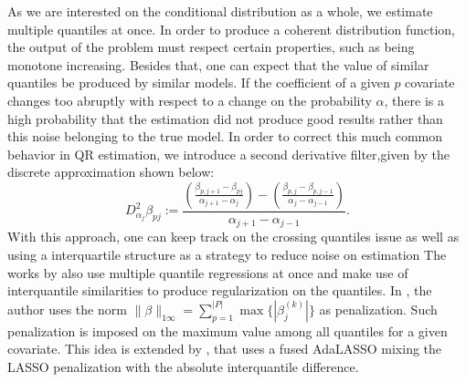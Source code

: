 As we are interested on the conditional distribution as a whole, we estimate multiple quantiles at once. In order to produce a coherent distribution function, the output of the problem must respect certain properties, such as being monotone increasing. 
Besides that, one can expect that the value of similar quantiles be produced by similar models. If the coefficient of a given $p$ covariate changes too abruptly with respect to a change on the probability $\alpha$, there is a high probability that the estimation did not produce good results rather than this noise belonging to the true model.  In order to correct this much common behavior in QR estimation, we introduce a second derivative filter,given by the discrete approximation shown below:
\begin{equation}
D_{\alpha_j}^{2} \beta_{pj} := \frac{\left(\frac{\beta_{p,j+1}-\beta_{pj}}{\alpha_{j+1}-\alpha_{j}}\right)-\left(\frac{\beta_{p,j}-\beta_{p,j-1}}{\alpha_{j}-\alpha_{j-1}}\right)}{\alpha_{j+1}-\alpha_{j-1}}. 
\end{equation}
With this approach, one can keep track on the crossing quantiles issue as well as using a interquartile structure as a strategy to reduce noise on estimation %
The works by \cite{zou_regularized_2008, jiang_interquantile_2014} also use multiple quantile regressions at once and make use of interquantile similarities to produce regularization on the quantiles. In \cite{zou_regularized_2008}, the author uses the norm $\| \beta \|_{1\infty}=\sum_{p=1}^{|P|} \max\{ |\beta_j^{(k)} |\}$ as penalization. Such penalization is imposed on the maximum value among all quantiles for a given covariate. This idea is extended by \cite{jiang_interquantile_2014}, that uses a fused AdaLASSO mixing the LASSO penalization with the absolute interquantile difference.

